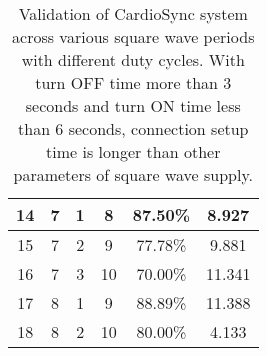\begin{table}[H]
\begin{tabular}{|c|c|c|c|c|c|}
14 & 7 & 1 & 8  & 87.50\% & 8.927  \\ \hline
15 & 7 & 2 & 9  & 77.78\% & 9.881  \\ \hline
16 & 7 & 3 & 10 & 70.00\% & 11.341 \\ \hline
17 & 8 & 1 & 9  & 88.89\% & 11.388 \\ \hline
18 & 8 & 2 & 10 & 80.00\% & 4.133  \\ \hline
\end{tabular}
\caption{Validation of CardioSync system across various square wave periods with different duty cycles. With turn OFF time more than 3 seconds and turn ON time less than 6 seconds, connection setup time is longer than other parameters of square wave supply.}
\label{tab:cardiosync_intermittent_exp}
\end{table}